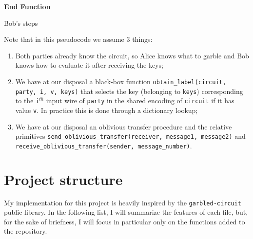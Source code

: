 \documentclass[12pt]{article}
\begin{document}
\begin{algorithm}[H]
  \SetAlgoLined
    \textbf{End Function}
   \caption{Bob's steps}\label{alg:bob}
\end{algorithm}

Note that in this pseudocode we assume 3 things:

\begin{enumerate}
  \item Both parties already know the circuit, so Alice knows what to garble and Bob knows how to evaluate it after receiving the keys;
  \item We have at our disposal a black-box function \texttt{obtain\_label(circuit, party, i, v, keys)} that selects the key (belonging to \texttt{keys}) corresponding to the \texttt{i}$^{th}$ input wire of \texttt{party} in the shared encoding of \texttt{circuit} if it has value \texttt{v}. In practice this is done through a dictionary lookup;
  \item We have at our disposal an oblivious transfer procedure and the relative primitives \texttt{send\_oblivious\_transfer(receiver, message1, message2)} and \\\texttt{receive\_oblivious\_transfer(sender, message\_number)}.
\end{enumerate}

\section{Project structure}
My implementation for this project is heavily inspired by the \texttt{garbled-circuit} \cite{GARBLED} public library. In the following list, I will summarize the features of each file, but, for the sake of briefness, I will focus in particular only on the functions added to the repository.
\end{document}
